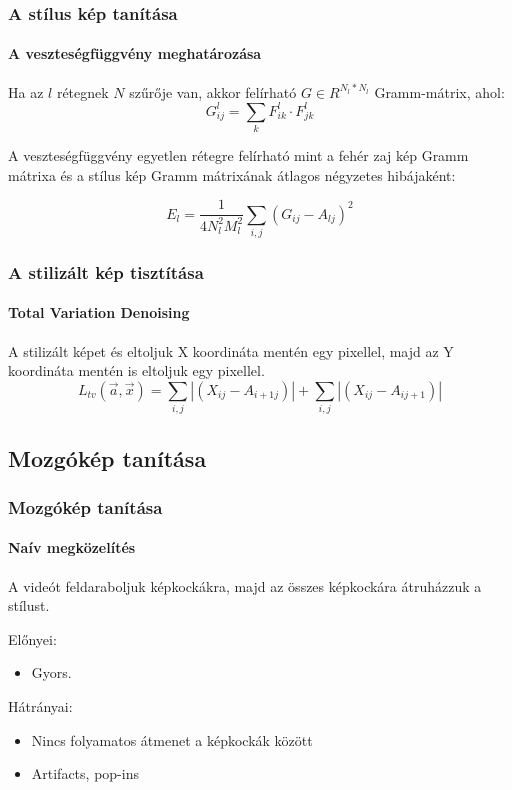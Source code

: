 \documentclass{beamer}
\begin{document}
	\begin{frame}
		\frametitle{A stílus kép tanítása}
		\framesubtitle{A veszteségfüggvény meghatározása}
		
		Ha az \(l\) rétegnek \(N\) szűrője van, akkor felírható \(G \in R^{N_l*N_l}\) Gramm-mátrix, ahol:
		\begin{equation}
			G^l_{ij} = \sum_{k} F^l_{ik} \cdot F^l_{jk}
		\end{equation}
		
		A veszteségfüggvény egyetlen rétegre felírható mint a fehér zaj kép Gramm mátrixa és a stílus kép Gramm mátrixának átlagos négyzetes hibájaként:
		 
		\begin{equation}
			E_l = \frac{1}{4N^2_l M^2_l} \sum_{i,j} (G_{ij} - A_{lj})^2
		\end{equation}
	\end{frame}

	\begin{frame}
		\frametitle{A stilizált kép tisztítása}
		\framesubtitle{Total Variation Denoising}
		
		A stilizált képet és eltoljuk X koordináta mentén egy pixellel, majd az Y koordináta mentén is eltoljuk egy pixellel.
		\begin{equation}
			L_{tv}(\vec{a}, \vec{x}) = \sum_{i,j} \left|(X_{ij} - A_{{i+1}j})\right| + \sum_{i, j} \left|(X_{ij} - A_{i {j+1}})\right|
		\end{equation}
	\end{frame}

	\subsection{Mozgókép tanítása}
	
	\begin{frame}
		\frametitle{Mozgókép tanítása}
		\framesubtitle{Naív megközelítés}
		A videót feldaraboljuk képkockákra, majd az összes képkockára átruházzuk a stílust.
		\newline
		
		Előnyei:
		\begin{itemize}
			\item Gyors.
		\end{itemize}
		
		Hátrányai:
		\begin{itemize}
			\item Nincs folyamatos átmenet a képkockák között
			\item Artifacts, pop-ins
		\end{itemize}
	\end{frame}
\end{document}

